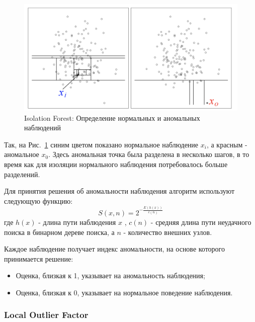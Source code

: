 \documentclass[12pt]{article}
\begin{document}
    \begin{figure}[h]
        \centering
        \includegraphics[width=0.8\linewidth]{IsolationForest.png}
        \caption{Isolation Forest: Определение нормальных и аномальных наблюдений}
        \label{sec:Research:Model:IsolationForest:fig:IsolationForest}
    \end{figure}
    
    \par Так, на Рис.~\ref{sec:Research:Model:IsolationForest:fig:IsolationForest} синим цветом показано нормальное наблюдение $x_i$, а красным - аномальное $x_0$. Здесь аномальная точка была разделена в несколько шагов, в то время как для изоляции нормального наблюдения потребовалось больше разделений.\\
    
    \par Для принятия решения об аномальности наблюдения алгоритм используют следующую функцию:
    $$
    S(x,n) = 2^{-\frac{E(h(x))}{c(n)}}
    $$
    \noindent где $h(x)$ - длина пути наблюдения $x$ , $c(n)$ - средняя длина пути неудачного поиска в бинарном дереве поиска, а $n$ - количество внешних узлов. \\

    \par Каждое наблюдение получает индекс аномальности, на основе которого принимается решение:
    \begin{itemize}
        \item Оценка, близкая к 1, указывает на аномальность наблюдения;
        \item Оценка, близкая к 0, указывает на нормальное поведение наблюдения.
    \end{itemize}


    \subsubsection{Local Outlier Factor}
    \label{sec:Research:Model:LocalOutlierFactor}
\end{document}
